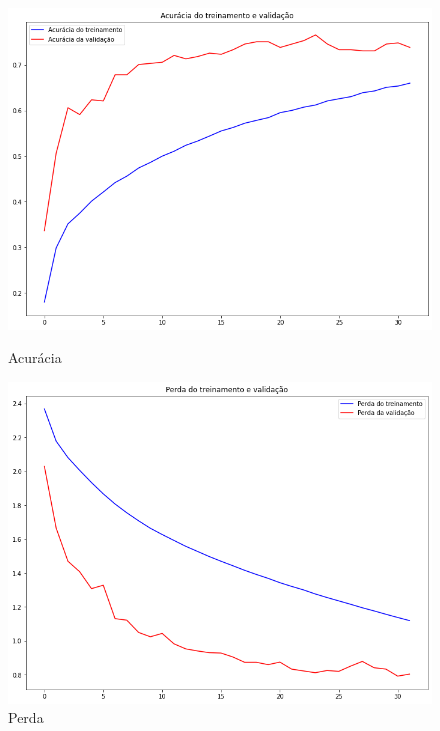 \documentclass[12pt]{article}
\begin{document}
\begin{figure}[!htb]
  \begin{minipage}{.47\textwidth}
    \centering
    \includegraphics[width=1.1\linewidth]{experiments/lenet5_aug_32/accuracy.png}
    \caption{Acurácia}\label{fig:experiment_lenet5_aug_32_accuracy}
  \end{minipage}\hfill
  \begin{minipage}{.47\textwidth}
    \centering
    \includegraphics[width=1.1\linewidth]{experiments/lenet5_aug_32/loss.png}
    \caption{Perda}\label{fig:experiment_lenet5_aug_32_loss}
  \end{minipage}
\end{figure}
\end{document}
